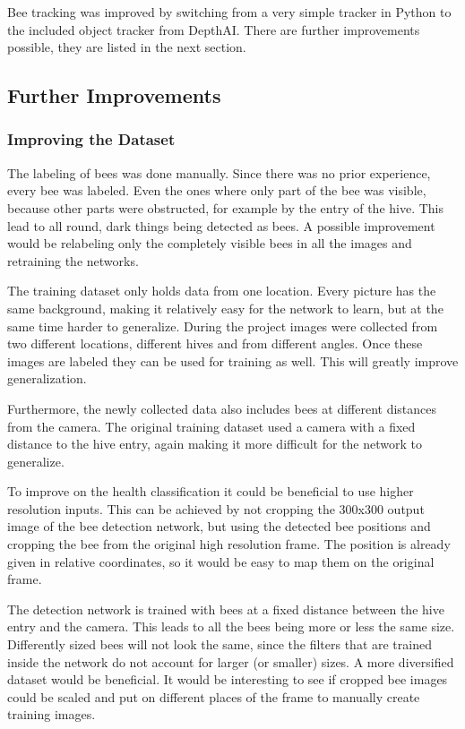 \documentclass[a4paper,titlepage]{article}
\begin{document}
Bee tracking was improved by switching from a very simple tracker in Python to the included object tracker from DepthAI.
There are further improvements possible, they are listed in the next section.

\subsection{Further Improvements}

\subsubsection{Improving the Dataset}

The labeling of bees was done manually.
Since there was no prior experience, every bee was labeled.
Even the ones where only part of the bee was visible, because other parts were obstructed, for example by the entry of the hive.
This lead to all round, dark things being detected as bees.
A possible improvement would be relabeling only the completely visible bees in all the images and retraining the networks.

The training dataset only holds data from one location.
Every picture has the same background, making it relatively easy for the network to learn, but at the same time harder to generalize.
During the project images were collected from two different locations, different hives and from different angles.
Once these images are labeled they can be used for training as well.
This will greatly improve generalization.

Furthermore, the newly collected data also includes bees at different distances from the camera.
The original training dataset used a camera with a fixed distance to the hive entry, again making it more difficult for the network to generalize.

To improve on the health classification it could be beneficial to use higher resolution inputs.
This can be achieved by not cropping the 300x300 output image of the bee detection network, but using the detected bee positions and cropping the bee from the original high resolution frame.
The position is already given in relative coordinates, so it would be easy to map them on the original frame.

The detection network is trained with bees at a fixed distance between the hive entry and the camera.
This leads to all the bees being more or less the same size.
Differently sized bees will not look the same, since the filters that are trained inside the network do not account for larger (or smaller) sizes.
A more diversified dataset would be beneficial.
It would be interesting to see if cropped bee images could be scaled and put on different places of the frame to manually create training images.
\end{document}
